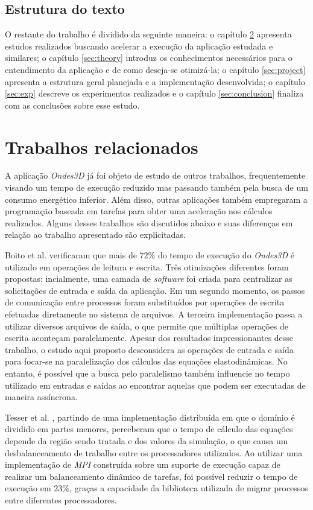 \documentclass[cic,tc]{iiufrgs}
\begin{document}
\section{Estrutura do texto}

O restante do trabalho é dividido da seguinte maneira: o capítulo \ref{sec:related} apresenta estudos realizados buscando acelerar a execução da aplicação estudada e similares; o capítulo
\ref{sec:theory} introduz os conhecimentos necessários para o entendimento da aplicação e de como deseja-se otimizá-la; o capítulo \ref{sec:project} apresenta a estrutura geral planejada e
a implementação desenvolvida; o capítulo \ref{sec:exp} descreve os experimentos realizados e o capítulo \ref{sec:conclusion} finaliza com as conclusões sobre esse estudo. 

\chapter{Trabalhos relacionados}\label{sec:related}

A aplicação \textit{Ondes3D} já foi objeto de estudo de outros trabalhos, frequentemente visando um tempo de execução reduzido mas passando também pela busca de um consumo energético 
inferior. Além disso, outras aplicações também empregaram a programação baseada em tarefas para obter uma aceleração nos cálculos realizados. Alguns desses trabalhos são discutidos abaixo e
suas diferenças em relação ao trabalho apresentado são explicitadas.

Boito et al. \cite{boito} verificaram que mais de $72\%$ do tempo de execução do \textit{Ondes3D} é utilizado em operações de leitura e escrita. Três otimizações diferentes foram
propostas: incialmente, uma camada de \textit{software} foi criada para centralizar as solicitações de entrada e saída da aplicação. Em um segundo momento, os passos de comunicação entre
processos foram substituídos por operações de escrita efetuadas diretamente no sistema de arquivos. A terceira implementação passa a utilizar diversos arquivos de saída, o que permite que
múltiplas operações de escrita aconteçam paralelamente. Apesar dos resultados impressionantes desse trabalho, o estudo aqui proposto desconsidera as operações de entrada e saída para focar-se
na paralelização dos cálculos das equações elastodinâmicas. No entanto, é possível que a busca pelo paralelismo também influencie no tempo utilizado em entradas e saídas ao encontrar aquelas
que podem ser executadas de maneira assíncrona. 

Tesser et al. \cite{dupros:hal-00797682}, partindo de uma implementação distribuída em que o domínio é dividido em partes menores, perceberam que o tempo de cálculo das equações
depende da região sendo tratada e dos valores da simulação, o que causa um desbalanceamento de trabalho entre os processadores utilizados. Ao utilizar uma implementação de \textit{MPI} construída sobre um suporte de execução capaz de realizar um balanceamento dinâmico de tarefas, foi possível reduzir o tempo de execução em $23\%$, graças a capacidade da biblioteca utilizada de migrar processos entre diferentes processadores.
\end{document}
